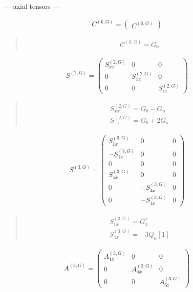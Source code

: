 \documentclass[fleqn,10pt]{jsarticle}
\begin{document}
\newpage
\begin{center}\LARGE --- axial tensors ---\end{center}
\begin{align*}
C^{(0,G)} = \begin{pmatrix} C^{(0,G)} \end{pmatrix}
\end{align*}
\begin{quote}
\begin{align*}
& C^{(0,G)} = G_{0}
\end{align*}
\end{quote}
\begin{align*}
S^{(2,G)} = \begin{pmatrix} S^{(2,G)}_{xx} & 0 & 0 \\ 0 & S^{(2,G)}_{xx} & 0 \\ 0 & 0 & S^{(2,G)}_{zz} \end{pmatrix}
\end{align*}
\begin{quote}
\begin{align*}
& S^{(2,G)}_{xx} = G_{0} - G_{u} \\
& S^{(2,G)}_{zz} = G_{0} + 2 G_{u}
\end{align*}
\end{quote}
\begin{align*}
S^{(3,G)} = \begin{pmatrix} S^{(3,G)}_{1x} & 0 & 0 \\ - S^{(3,G)}_{1x} & 0 & 0 \\ 0 & 0 & 0 \\ S^{(3,G)}_{4x} & 0 & 0 \\ 0 & - S^{(3,G)}_{4x} & 0 \\ 0 & - S^{(3,G)}_{1x} & 0 \end{pmatrix}
\end{align*}
\begin{quote}
\begin{align*}
& S^{(3,G)}_{1x} = G_{3}^{\gamma} \\
& S^{(3,G)}_{4x} = - 3 Q_{u}[1]
\end{align*}
\end{quote}
\begin{align*}
A^{(3,G)} = \begin{pmatrix} A^{(3,G)}_{4x} & 0 & 0 \\ 0 & A^{(3,G)}_{4x} & 0 \\ 0 & 0 & A^{(3,G)}_{6z} \end{pmatrix}
\end{align*}
\end{document}
